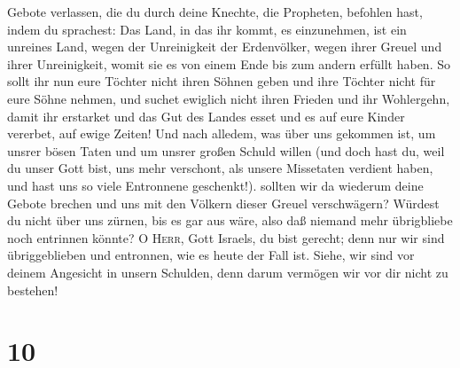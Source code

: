 Gebote verlassen,  die du durch deine Knechte, die
Propheten, befohlen hast, indem du sprachest: Das Land, in das ihr
kommt, es einzunehmen, ist ein unreines Land, wegen der Unreinigkeit der
Erdenvölker, wegen ihrer Greuel und ihrer Unreinigkeit, womit sie es von
einem Ende bis zum andern erfüllt haben.  So sollt ihr
nun eure Töchter nicht ihren Söhnen geben und ihre Töchter nicht für
eure Söhne nehmen, und suchet ewiglich nicht ihren Frieden und ihr
Wohlergehn, damit ihr erstarket und das Gut des Landes esset und es auf
eure Kinder vererbet, auf ewige Zeiten!  Und nach
alledem, was über uns gekommen ist, um unsrer bösen Taten und um unsrer
großen Schuld willen (und doch hast du, weil du unser Gott bist, uns
mehr verschont, als unsere Missetaten verdient haben, und hast uns so
viele Entronnene geschenkt!).  sollten wir da wiederum
deine Gebote brechen und uns mit den Völkern dieser Greuel verschwägern?
Würdest du nicht über uns zürnen, bis es gar aus wäre, also daß niemand
mehr übrigbliebe noch entrinnen könnte?  O \textsc{Herr},
Gott Israels, du bist gerecht; denn nur wir sind übriggeblieben und
entronnen, wie es heute der Fall ist. Siehe, wir sind vor deinem
Angesicht in unsern Schulden, denn darum vermögen wir vor dir nicht zu
bestehen!

\hypertarget{section-9}{%
\section{10}\label{section-9}}

